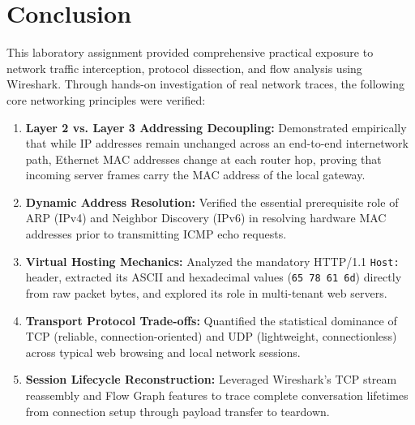 \documentclass[12pt, a4paper]{article}
\begin{document}
\section{Conclusion}

This laboratory assignment provided comprehensive practical exposure to network traffic interception, protocol dissection, and flow analysis using Wireshark. Through hands-on investigation of real network traces, the following core networking principles were verified:
\begin{enumerate}
    \item \textbf{Layer 2 vs. Layer 3 Addressing Decoupling:} Demonstrated empirically that while IP addresses remain unchanged across an end-to-end internetwork path, Ethernet MAC addresses change at each router hop, proving that incoming server frames carry the MAC address of the local gateway.
    \item \textbf{Dynamic Address Resolution:} Verified the essential prerequisite role of ARP (IPv4) and Neighbor Discovery (IPv6) in resolving hardware MAC addresses prior to transmitting ICMP echo requests.
    \item \textbf{Virtual Hosting Mechanics:} Analyzed the mandatory HTTP/1.1 \texttt{Host:} header, extracted its ASCII and hexadecimal values (\texttt{65 78 61 6d}) directly from raw packet bytes, and explored its role in multi-tenant web servers.
    \item \textbf{Transport Protocol Trade-offs:} Quantified the statistical dominance of TCP (reliable, connection-oriented) and UDP (lightweight, connectionless) across typical web browsing and local network sessions.
    \item \textbf{Session Lifecycle Reconstruction:} Leveraged Wireshark's TCP stream reassembly and Flow Graph features to trace complete conversation lifetimes from connection setup through payload transfer to teardown.
\end{enumerate}
\end{document}
